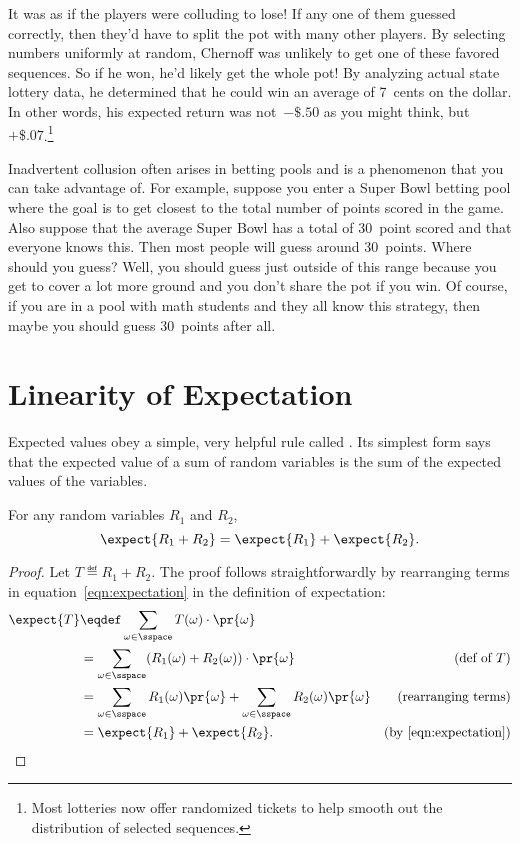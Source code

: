 It was as if the players were colluding to lose!  If any one of them
guessed correctly, then they'd have to split the pot with many other
players.  By selecting numbers uniformly at random, Chernoff was
unlikely to get one of these favored sequences.  So if he won, he'd
likely get the whole pot!  By analyzing actual state lottery data, he
determined that he could win an average of 7~cents on the dollar.  In
other words, his expected return was not~$-\${.}50$ as you might
think, but~$+\${.}07$.\footnote{Most lotteries now offer randomized
  tickets to help smooth out the distribution of selected sequences.}

Inadvertent collusion often arises in betting pools and is a
phenomenon that you can take advantage of.  For example, suppose you
enter a Super Bowl betting pool where the goal is to get closest to
the total number of points scored in the game.  Also suppose that the
average Super Bowl has a total of 30~point scored and that everyone
knows this.  Then most people will guess around 30~points.  Where
should you guess?  Well, you should guess just outside of this range
because you get to cover a lot more ground and you don't share the pot
if you win.  Of course, if you are in a pool with math students and
they all know this strategy, then maybe you should guess 30~points
after all.

\section{Linearity of Expectation}\label{finlin}

Expected values obey a simple, very helpful rule called
.  Its simplest form says that the
expected value of a sum of random variables is the sum of the expected
values of the variables.

\begin{theorem}\label{expsum-2}
For any random variables $R_1$ and $R_2$,
\[
\expect{R_1 + R_2} = \expect{R_1} + \expect{R_2}.
\]
\end{theorem}

\begin{proof}
Let $T \eqdef R_1+R_2$.  The proof follows straightforwardly by
rearranging terms in equation~\eqref{eqn:expectation} in the
definition of expectation:
\begin{align*}
\expect{T}
     & \eqdef \sum_{\omega \in \sspace} T(\omega) \cdot \pr{\omega}\\
        & = \sum_{\omega \in \sspace} (R_1(\omega) + R_2(\omega)) \cdot \pr{\omega}
                         & \text{(def of $T$)}\\
        & = \sum_{\omega \in \sspace} R_1(\omega) \pr{\omega} + 
              \sum_{\omega \in \sspace} R_2(\omega) \pr{\omega} & \text{(rearranging terms)}\\
        & = \expect{R_1} + \expect{R_2}.
                & \text{(by~\eqref{eqn:expectation})}
\end{align*}
\end{proof}

